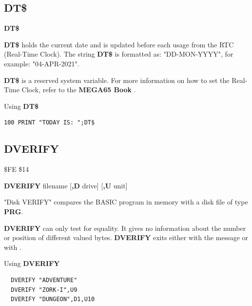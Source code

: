 \subsection{DT\$}
\begin{description}[leftmargin=2cm,style=nextline]
\item [Format:] {\bf DT\$}
\item [Usage:]  {\bf DT\$} holds the current date and is updated before
                each usage from the RTC (Real-Time Clock).
                The string {\bf DT\$} is formatted as:
                "DD-MON-YYYY", for example: "04-APR-2021".
\item[Remarks:] {\bf DT\$} is a reserved system variable.
                For more information on how to set the Real-Time Clock,
                refer to
\ifdefined\printmanual
the {\bf MEGA65 Book}
\else
\fi
				.

\item [Example:] Using {\bf DT\$}
\begin{tcolorbox}[colback=black,coltext=white]
\verbatimfont{\codefont}
\begin{verbatim}
100 PRINT "TODAY IS: ";DT$
\end{verbatim}
\end{tcolorbox}
\end{description}


\newpage
\subsection{DVERIFY}
\begin{description}[leftmargin=2cm,style=nextline]
\item [Token:] \$FE \$14
\item [Format:] {\bf DVERIFY} filename [{\bf,D} drive] [{\bf,U} unit]
\item [Usage:]
   "Disk VERIFY" compares the BASIC program
   in memory with a disk file of type {\bf PRG}.

   \filenamedefinition

   \drivedefinition

   \unitdefinition

\item [Remarks:]
   {\bf DVERIFY} can only test for equality. It gives no information
   about the number or position of different valued bytes.
    {\bf DVERIFY} exits either with the message 
    or with .

\item [Example:] Using {\bf DVERIFY}
\begin{tcolorbox}[colback=black,coltext=white]
\verbatimfont{\codefont}
\begin{verbatim}
  DVERIFY "ADVENTURE"
  DVERIFY "ZORK-I",U9
  DVERIFY "DUNGEON",D1,U10
\end{verbatim}
\end{tcolorbox}
\end{description}

